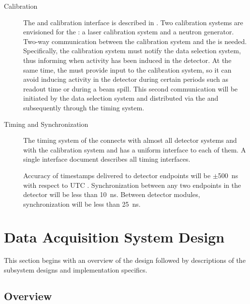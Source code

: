 \begin{description}
\item[Calibration] The  and calibration interface is described in . Two calibration systems are envisioned for the : a laser calibration system and a neutron generator. 
  Two-way communication between the calibration system and the
   is needed.  Specifically, the calibration system must
  notify the data selection system, thus informing 
  when activity has been induced in the detector. At the same time, the  must provide input to the calibration system, so it can avoid inducing activity in the detector during certain periods such as  readout time or during a beam spill.
This second communication will be initiated by the data selection
system and distributed via the  and
subsequently through the
 timing system.


\item[Timing and Synchronization] The timing system of the   connects with almost all detector systems and with the calibration system and has a uniform interface to each of them. 
  A single interface document  describes all timing interfaces. 

Accuracy of timestamps delivered to  detector endpoints will be $\pm$\SI{500}{\nano\second} with respect to UTC . Synchronization between any two endpoints in the detector will be less than \SI{10}{\nano\second}. Between detector modules, synchronization will be less than \SI{25}{\nano\second}.  
\end{description}

\section{Data Acquisition System Design}
\label{sec:fd-daq:design}

This section begins with an overview of the 
design followed by
descriptions of the subsystem designs and implementation specifics.

\subsection{Overview}
\label{sec:fd-daq:design-overview}

